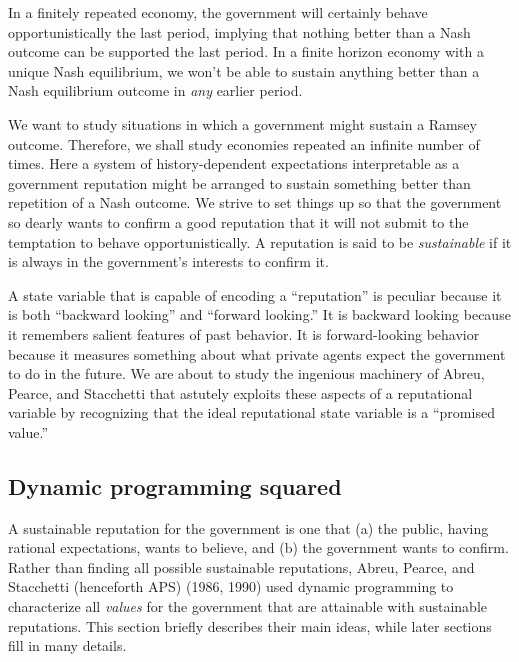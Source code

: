  In a finitely
repeated economy, the government will certainly behave opportunistically
the last period, implying that nothing better than a Nash
outcome can be supported the last period.  In a finite
horizon economy with a unique Nash equilibrium, we won't be
able to sustain anything better than a Nash equilibrium
outcome in {\it any\/} earlier period.     


We want to study situations in which a government might sustain a Ramsey
outcome.  Therefore, we shall study economies repeated an infinite number
of times.  Here a system of history-dependent expectations interpretable
as a government reputation might be arranged to sustain something better than
repetition of a Nash outcome.
We strive  to set things up so that the government so dearly  wants to
confirm a  good reputation that it will not submit to the temptation to
behave opportunistically.   A reputation is
said to be {\it sustainable\/} if it is always in the government's
interests to confirm it.

A state  variable that is capable of encoding a ``reputation'' is peculiar because it is both
``backward looking'' and ``forward looking.''  It is
backward looking  because it remembers salient features of past  behavior.   It is  forward-looking behavior because it
measures something about what private agents expect the government to do in the future.
We are about to study the ingenious machinery of
Abreu, Pearce, and    Stacchetti that astutely exploits
these aspects of a reputational variable by recognizing that the ideal reputational state variable is a ``promised value.''

\subsection{Dynamic programming squared}
%
A sustainable reputation for the government is one that (a) the public, having rational expectations, wants to believe,
and (b) the government wants to confirm.
Rather than finding all possible sustainable reputations,
Abreu, Pearce, and Stacchetti  (henceforth APS) (1986, 1990) used dynamic
programming to characterize all {\it values\/} for the government that are
attainable  with sustainable reputations.  This section briefly describes
their main ideas, while later sections fill in many details.
    

